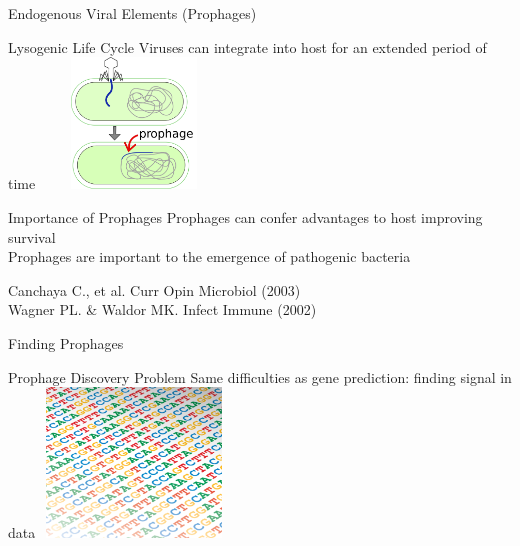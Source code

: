 \documentclass[11pt, xcolor=table]{beamer}
\begin{document}
	\begin{frame}{Endogenous Viral Elements (Prophages)}
	\begin{block}{Lysogenic Life Cycle}
	Viruses can integrate into host for an extended period of time
	\center
	\vspace{-0.2cm}
	\includegraphics[height=3.5cm, width=5cm]{prophage.png}
	\end{block}
	\begin{block}{Importance of Prophages}
	Prophages can confer advantages to host improving survival \\ 
	Prophages are important to the emergence of pathogenic bacteria
	\end{block}
	
	\tiny{Canchaya C., et al. Curr Opin Microbiol (2003) \\ Wagner PL. \& Waldor MK. Infect Immune (2002)}
	\end{frame}
	\begin{frame}{Finding Prophages}
	\begin{block}{Prophage Discovery Problem}
	Same difficulties as gene prediction: finding signal in data
	\center
	\includegraphics[height=4cm, width=5cm]{dna.png}
	\end{block}
	\end{frame}
\end{document}
